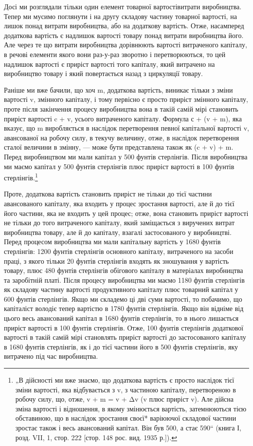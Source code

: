 Досі ми розглядали тільки один елемент товарної вартостівитрати
виробництва. Тепер ми мусимо поглянути і на другу
складову частину товарної вартості, на лишок понад витрати
виробництва, або на додаткову вартість. Отже, насамперед додаткова
вартість є надлишок вартості товару понад витрати виробництва
його. Але через те що витрати виробництва дорівнюють
вартості витраченого капіталу, в речові елементи якого вони
раз-у-раз зворотно і перетворюються, то цей надлишок вартості
є приріст вартості того капіталу, який витрачено на виробництво
товару і який повертається назад з циркуляції товару.

Раніше ми вже бачили, що хоч m, додаткова вартість, виникає
тільки з зміни вартості v, змінного капіталу, і тому первісно
є просто приріст змінного капіталу, проте після закінчення
процесу виробництва вона в такій самій мірі становить
приріст вартості c + v, усього витраченого капіталу. Формула
с + (v + m), яка вказує, що m виробляється в наслідок перетворення
певної капітальної вартості v, авансованої на робочу силу,
в текучу величину, отже, в наслідок перетворення сталої величини
в змінну, — може бути представлена також як (c + v) + m.
Перед виробництвом ми мали капітал у 500 фунтів стерлінгів.
Після виробництва ми маємо капітал у 500 фунтів стерлінгів
плюс приріст вартості в 100 фунтів стерлінгів.\footnote{
„В дійсності ми вже знаємо, що додаткова вартість є просто наслідок
тієї зміни вартості, яка відбувається з v, з частиною капіталу, перетвореною
в робочу силу, що, отже, v + m = v + Δv (v плюс приріст v). Але дійсна зміна
вартості і відношення, в якому змінюється вартість, затемнюються тією обставиною,
що в наслідок зростання своєї* варіюючої складової частини зростає
також і весь авансований капітал. Він був 500, а стає 590“ (книга І, розд.
VII, 1, стор. 222 [стор. 148 рос. вид. 1935 р.]).
}

Проте, додаткова вартість становить приріст не тільки до
тієї частини авансованого капіталу, яка входить у процес зростання
вартості, але й до тієї його частини, яка не входить у цей
процес; отже, вона становить приріст вартості не тільки до того
витраченого капіталу, який заміщається з виручених витрат виробництва
товару, але й до капіталу, взагалі застосованого у виробництві.
Перед процесом виробництва ми мали капітальну
вартість у 1680 фунтів стерлінгів: 1200 фунтів стерлінгів основного
капіталу, витраченого на засоби праці, з якого тільки
20 фунтів стерлінгів входять як зношування у вартість товару,
плюс 480 фунтів стерлінгів обігового капіталу в матеріалах виробництва
та заробітній платі. Після процесу виробництва ми
маємо 1180 фунтів стерлінгів як складову частину вартості
продуктивного капіталу плюс товарний капітал у 600 фунтів
стерлінгів. Якщо ми складемо ці дві суми вартості, то побачимо,
що капіталіст володіє тепер вартістю в 1780 фунтів стерлінгів.
Якщо він відніме від цього весь авансований капітал в 1680
фунтів стерлінгів, то в нього лишається приріст вартості в 100
фунтів стерлінгів. Отже, 100 фунтів стерлінгів додаткової вартості
в такій самій мірі становлять приріст вартості до застосованого
капіталу в 1680 фунтів стерлінгів, як і до тієї частини
його в 500 фунтів стерлінгів, яку витрачено під час виробництва.

